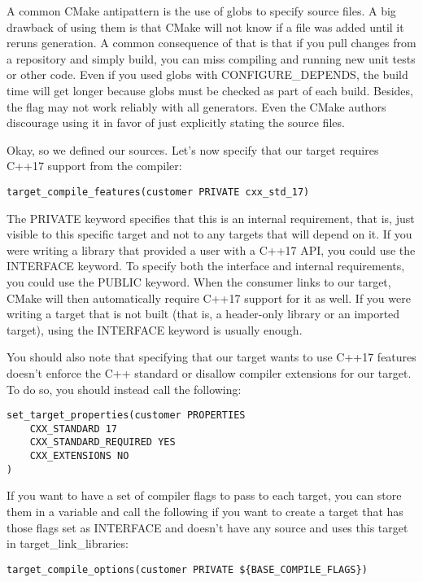 A common CMake antipattern is the use of globs to specify source files. A big drawback of using them is that CMake will not know if a file was added until it reruns generation. A common consequence of that is that if you pull changes from a repository and simply build, you can miss compiling and running new unit tests or other code. Even if you used globs with CONFIGURE\_DEPENDS, the build time will get longer because globs must be checked as part of each build. Besides, the flag may not work reliably with all generators. Even the CMake authors discourage using it in favor of just explicitly stating the source files.

Okay, so we defined our sources. Let's now specify that our target requires C++17 support from the compiler:

\begin{lstlisting}[style=styleCMake]
target_compile_features(customer PRIVATE cxx_std_17)
\end{lstlisting}

The PRIVATE keyword specifies that this is an internal requirement, that is, just visible to this specific target and not to any targets that will depend on it. If you were writing a library that provided a user with a C++17 API, you could use the INTERFACE keyword. To specify both the interface and internal requirements, you could use the PUBLIC keyword. When the consumer links to our target, CMake will then automatically require C++17 support for it as well. If you were writing a target that is not built (that is, a header-only library or an imported target), using the INTERFACE keyword is usually enough.

You should also note that specifying that our target wants to use C++17 features doesn't enforce the C++ standard or disallow compiler extensions for our target. To do so, you should instead call the following:

\begin{lstlisting}[style=styleCMake]
set_target_properties(customer PROPERTIES
	CXX_STANDARD 17
	CXX_STANDARD_REQUIRED YES
	CXX_EXTENSIONS NO
)
\end{lstlisting}

If you want to have a set of compiler flags to pass to each target, you can store them in a variable and call the following if you want to create a target that has those flags set as INTERFACE and doesn't have any source and uses this target in target\_link\_libraries:

\begin{lstlisting}[style=styleCMake]
target_compile_options(customer PRIVATE ${BASE_COMPILE_FLAGS})
\end{lstlisting}

